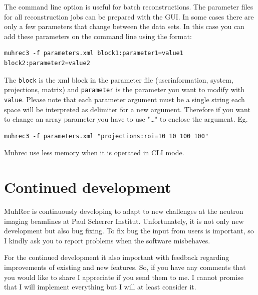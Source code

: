 \documentclass[a4paper]{scrreprt}
\begin{document}
The command line option is useful for batch reconstructions. The parameter files
for all reconstruction jobs can be prepared with the GUI. In some cases there
are only a few parameters that change between the data sets. In this case you can add these parameters on the command line using the format:
\begin{verbatim}
muhrec3 -f parameters.xml block1:parameter1=value1 block2:parameter2=value2 
\end{verbatim}
The \verb+block+ is the xml block in the parameter file (userinformation, system, projections, matrix) and \verb+parameter+ is the parameter you want to modify with \verb+value+.  Please note that each parameter argument must be a single string each space will be interpreted as delimiter for a new argument. Therefore if you want to change an array parameter you have to use "\ldots" to enclose the argument.  Eg.
\begin{verbatim}
muhrec3 -f parameters.xml "projections:roi=10 10 100 100" 
\end{verbatim}
Muhrec use less memory when it is operated in CLI mode. 

\chapter{Continued development}
MuhRec is continuously developing to adapt to new challenges at the neutron
imaging beamlines at Paul Scherrer Institut. Unfortunately, it is not only new
development but also bug fixing. To fix bug the input from users is important,
so I kindly ask you to report problems when the software misbehaves.

For the continued development it also important with feedback regarding
improvements of existing and new features. So, if you have any comments that you
would like to share I appreciate if you send them to me. I cannot promise that I
will implement everything but I will at least consider it.



\appendix
\end{document}
